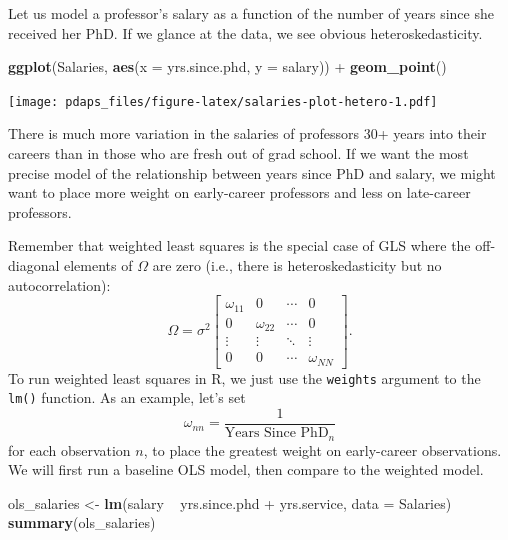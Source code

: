 \documentclass[12pt,oneside,openany]{book}
\newenvironment{Shaded}{\begin{snugshade}}{\end{snugshade}}
\newcommand{\KeywordTok}[1]{\textcolor[rgb]{0.13,0.29,0.53}{\textbf{{#1}}}}
\newcommand{\DataTypeTok}[1]{\textcolor[rgb]{0.13,0.29,0.53}{{#1}}}
\newcommand{\StringTok}[1]{\textcolor[rgb]{0.31,0.60,0.02}{{#1}}}
\newcommand{\NormalTok}[1]{{#1}}
\begin{document}
Let us model a professor's salary as a function of the number of years
since she received her PhD. If we glance at the data, we see obvious
heteroskedasticity.

\begin{Shaded}
\begin{Highlighting}[]
\KeywordTok{ggplot}\NormalTok{(Salaries, }\KeywordTok{aes}\NormalTok{(}\DataTypeTok{x =} \NormalTok{yrs.since.phd, }\DataTypeTok{y =} \NormalTok{salary)) +}
\StringTok{    }\KeywordTok{geom_point}\NormalTok{()}
\end{Highlighting}
\end{Shaded}

\texttt{[image: pdaps\_files/figure-latex/salaries-plot-hetero-1.pdf]}

There is much more variation in the salaries of professors 30+ years
into their careers than in those who are fresh out of grad school. If we
want the most precise model of the relationship between years since PhD
and salary, we might want to place more weight on early-career
professors and less on late-career professors.

Remember that weighted least squares is the special case of GLS where
the off-diagonal elements of \(\Omega\) are zero (i.e., there is
heteroskedasticity but no autocorrelation): \[
\Omega = \sigma^2 \begin{bmatrix}
  \omega_{11} & 0 & \cdots & 0 \\
  0 & \omega_{22} & \cdots & 0 \\
  \vdots & \vdots & \ddots & \vdots \\
  0 & 0 & \cdots & \omega_{NN}
\end{bmatrix}.
\] To run weighted least squares in R, we just use the \texttt{weights}
argument to the \texttt{lm()} function. As an example, let's set \[
\omega_{nn} = \frac{1}{\text{Years Since PhD}_n}
\] for each observation \(n\), to place the greatest weight on
early-career observations. We will first run a baseline OLS model, then
compare to the weighted model.

\begin{Shaded}
\begin{Highlighting}[]
\NormalTok{ols_salaries <-}\StringTok{ }\KeywordTok{lm}\NormalTok{(salary ~}\StringTok{ }\NormalTok{yrs.since.phd +}\StringTok{ }\NormalTok{yrs.service,}
                   \DataTypeTok{data =} \NormalTok{Salaries)}
\KeywordTok{summary}\NormalTok{(ols_salaries)}
\end{Highlighting}
\end{Shaded}
\end{document}
